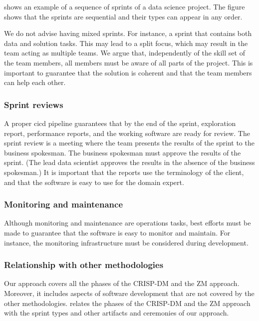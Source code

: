  shows an example of a sequence of sprints of a data science project.
The figure shows that the sprints are sequential and their types can appear in
any order.

We do not advise having mixed sprints.  For instance, a sprint that contains both data
and solution tasks.  This may lead to a split focus, which may result in the team acting
as multiple teams.  We argue that, independently of the skill set of the team members,
all members must be aware of all parts of the project.  This is important to guarantee
that the solution is coherent and that the team members can help each other.

\subsubsection{Sprint reviews}

A proper \gls{cicd} pipeline guarantees that by the end of the sprint,
exploration report, performance reports, and the working software are ready for review.
The sprint review is a meeting where the team presents the results of the sprint to the
business spokesman.  The business spokesman must approve the results of the sprint.
(The lead data scientist approves the results in the absence of the business spokesman.)
It is important that the reports use the terminology of the client, and that the
software is easy to use for the domain expert.

\subsubsection{Monitoring and maintenance} Although monitoring and maintenance are
operations tasks, best efforts must be made to guarantee that the software is easy to
monitor and maintain.  For instance, the monitoring infrastructure must be
considered during development.

\subsubsection{Relationship with other methodologies}

Our approach covers all the phases of the CRISP-DM and the ZM approach.  Moreover, it
includes aspects of software development that are not covered by the other
methodologies.  relates the phases of the CRISP-DM and the ZM approach
with the sprint types and other artifacts and ceremonies of our approach.


